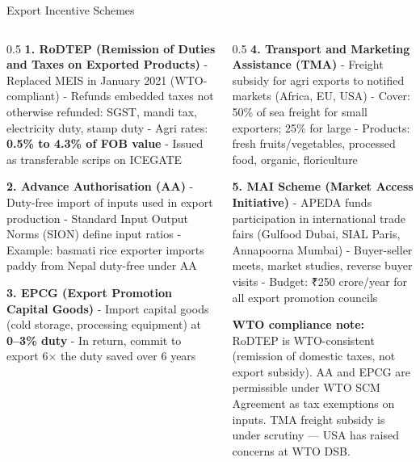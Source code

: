 \documentclass[
  ignorenonframetext,
  aspectratio=169,
]{beamer}
\makeatletter
\let\quarto@originallabel\label
\DeclareRobustCommand*{\label}[1]{\quarto@originallabel{#1}}
\makeatother
\begin{document}
\begin{frame}
\begin{block}{Export Incentive Schemes}
\label{export-incentive-schemes}
\begin{columns}[T]
\begin{column}{0.5\linewidth}
\textbf{1. RoDTEP (Remission of Duties and Taxes on Exported Products)}
- Replaced MEIS in January 2021 (WTO-compliant) - Refunds embedded taxes
not otherwise refunded: SGST, mandi tax, electricity duty, stamp duty -
Agri rates: \textbf{0.5\% to 4.3\% of FOB value} - Issued as
transferable scrips on ICEGATE

\textbf{2. Advance Authorisation (AA)} - Duty-free import of inputs used
in export production - Standard Input Output Norms (SION) define input
ratios - Example: basmati rice exporter imports paddy from Nepal
duty-free under AA

\textbf{3. EPCG (Export Promotion Capital Goods)} - Import capital goods
(cold storage, processing equipment) at \textbf{0--3\% duty} - In
return, commit to export 6× the duty saved over 6 years
\end{column}

\begin{column}{0.5\linewidth}
\textbf{4. Transport and Marketing Assistance (TMA)} - Freight subsidy
for agri exports to notified markets (Africa, EU, USA) - Cover: 50\% of
sea freight for small exporters; 25\% for large - Products: fresh
fruits/vegetables, processed food, organic, floriculture

\textbf{5. MAI Scheme (Market Access Initiative)} - APEDA funds
participation in international trade fairs (Gulfood Dubai, SIAL Paris,
Annapoorna Mumbai) - Buyer-seller meets, market studies, reverse buyer
visits - Budget: ₹250 crore/year for all export promotion councils

\textbf{WTO compliance note:} RoDTEP is WTO-consistent (remission of
domestic taxes, not export subsidy). AA and EPCG are permissible under
WTO SCM Agreement as tax exemptions on inputs. TMA freight subsidy is
under scrutiny --- USA has raised concerns at WTO DSB.
\end{column}
\end{columns}
\end{block}
\end{frame}
\end{document}
